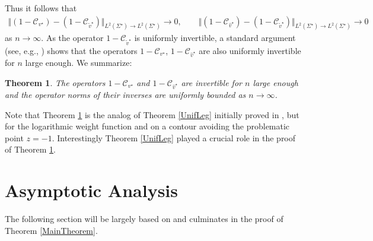 \documentclass[11pt]{article}
\numberwithin{equation}{section}
\newcommand{\bv}{v}
\newcommand{\hv}{{\widehat v}}
\newcommand{\stv}{{\widetilde v^\star}}
\newcommand{\sCauv}{\mathcal C_{\bv^\star}}
\newcommand{\sCauhv}{\mathcal C_{\hv^\star}}
\newcommand{\sCautv}{\mathcal C_{\stv}}
\newtheorem{Theorem}{Theorem}[section]
\numberwithin{equation}{section}
\begin{document}
Thus it follows that
\begin{align*}
 \Vert (1-\sCauv) - (1-\sCautv) \Vert_{L^2(\Sigma^\star) \to L^2(\Sigma^\star)} \to 0,
 \qquad
 \Vert (1-\sCauhv) - (1-\sCautv) \Vert_{L^2(\Sigma^\star) \to L^2(\Sigma^\star)} \to 0
\end{align*}
as $n \to \infty$. As the operator $1-\sCautv$ is uniformly invertible, a standard argument (see, e.g., \cite[Theorem~4.7]{CD}) shows that the operators $1-\sCauv$, $1-\sCauhv$ are also uniformly invertible for $n$ large enough. We summarize:
\begin{Theorem}\label{TheoremUniInv}
The operators $1-\sCauv$ and $1-\sCauhv$ are invertible for $n$ large enough and the operator norms of their inverses are uniformly bounded as $n \to \infty$.
\end{Theorem}
Note that Theorem \ref{TheoremUniInv} is the analog of Theorem \ref{UnifLeg} initially proved in \cite[Theorem~4.5]{CD}, but for the logarithmic weight function and on a contour avoiding the problematic point $z = -1$. Interestingly Theorem \ref{UnifLeg} played a crucial role in the proof of Theorem \ref{TheoremUniInv}.

\section{Asymptotic Analysis}
\label{SectAsymptoticAnalysis}
The following section will be largely based on \cite[Section~5]{CD} and culminates in the proof of Theorem \ref{MainTheorem}.
\end{document}
